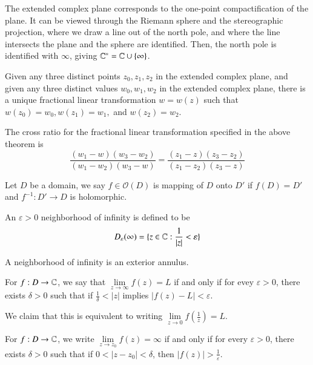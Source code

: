 \documentclass[12pt, a4paper, oneside, openright, titlepage]{book}
\begin{document}
The extended complex plane corresponds to the one-point compactification of the plane. It can be viewed through the Riemann sphere and the stereographic projection, where we draw a line out of the north pole, and where the line intersects the plane and the sphere are identified. Then, the north pole is identified with $\infty$, giving $\mathbb C^* = \mathbb C\cup\{\infty\}$.

\begin{thm}
    Given any three distinct points $z_0,z_1,z_2$ in the extended complex plane, and given any three distinct values $w_0,w_1,w_2$ in the extended complex plane, there is a unique fractional linear transformation $w = w(z)$ such that $w(z_0) = w_0,w(z_1) = w_1,$ and $w(z_2) = w_2$.
\end{thm}

\begin{defn}
    The cross ratio for the fractional linear transformation specified in the above theorem is \begin{equation*}
        \frac{(w_1 - w)(w_3 - w_2)}{(w_1 - w_2)(w_3 - w)} = \frac{(z_1-z)(z_3-z_2)}{(z_1-z_2)(z_3-z)}
    \end{equation*}
\end{defn}


\begin{defn}
    Let $D$ be a domain, we say $f \in \mathcal{O}(D)$ is  mapping of $D$ onto $D'$ if $f(D)  = D'$ and $f^{-1}:D'\rightarrow D$ is holomorphic.
\end{defn}

\begin{defn}
    An $\varepsilon > 0$ neighborhood of infinity is defined to be \begin{equation*}
        D_{\varepsilon}(\infty) = \{z \in \mathbb C:\frac{1}{|z|} < \varepsilon\}
    \end{equation*}
\end{defn}
A neighborhood of infinity is an exterior annulus.

\begin{defn}
    For $f:D\rightarrow \mathbb C$, we say that $\lim\limits_{z\rightarrow \infty}f(z) = L$ if and only if for evey $\varepsilon > 0$, there exists $\delta > 0$ such that if $\frac{1}{\delta} < |z|$ implies $|f(z) - L| < \varepsilon$.
\end{defn}

We claim that this is equivalent to writing $\lim\limits_{z\rightarrow 0}f\left(\frac{1}{z}\right) = L$. 

\begin{defn}
    For $f:D\rightarrow \mathbb C$, we write $\lim\limits_{z\rightarrow z_0}f(z) = \infty$ if and only if for every $\varepsilon > 0$, there exists $\delta > 0$ such that if $0 < |z-z_0| < \delta$, then $|f(z)| > \frac{1}{\varepsilon}$.
\end{defn}
\end{document}

